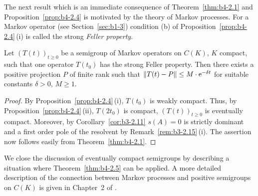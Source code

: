 The next result which is an immediate consequence of Theorem~\ref{thm:b4-2.1} and
Proposition~\ref{prop:b4-2.4} is motivated by the theory of Markov processes.
For a Markov operator (see Section~\ref{sec:b1-3}) condition (b) of Proposition~\ref{prop:b4-2.4}\,(i) is called the strong \emph{Feller property}. 
\begin{theorem}\label{thm:b4-2.5}
	Let $(T(t))_{t \geq 0}$ be a semigroup of Markov operators on
	$C(K)$, $K$ compact, such that one operator $T(t_{0})$ has the strong Feller
	property.
	Then there exists a positive projection $P$ of finite rank
	such that $\|T(t) - P\| \leq M\cdot \eu^{-\delta t}$ for suitable constants $\delta>0$, $M \geq 1$.
\end{theorem}
\begin{proof}
	By Proposition~\ref{prop:b4-2.4}\,(i), $T(t_{0})$ is weakly compact.
	Thus, by Proposition~\ref{prop:b4-2.4}\,(ii),
	$T(2t_{0})$ is compact, \ie  $(T(t))_{t \geq 0}$ is eventually compact.
	Moreover,
	by Corollary~\ref{cor:b3-2.11} $s(A) = 0$ is strictly dominant and a first order
	pole of the resolvent by Remark~\ref{rem:b3-2.15}\,(i).
	The assertion now follows
	easily from Theorem~\ref{thm:b4-2.1}.
\end{proof}
We close the discussion of eventually compact semigroups by describing
a situation where Theorem~\ref{thm:b4-2.5} can be applied.
A more detailed description
of the connection between Markov processes and positive semigroups on
$C(K)$ is given in Chapter~2 of \textcite{vancasteren:1985}.
